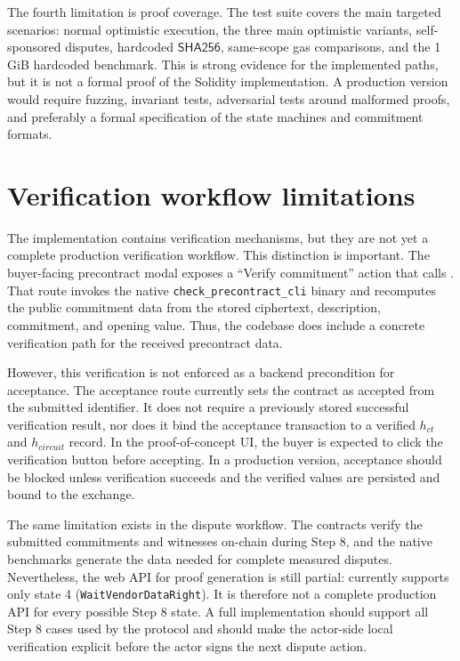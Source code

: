 The fourth limitation is proof coverage. The test suite covers the main targeted scenarios:
normal optimistic execution, the three main optimistic variants, self-sponsored disputes,
hardcoded \(\mathsf{SHA256}\), same-scope gas comparisons, and the 1 GiB hardcoded
benchmark. This is strong evidence for the implemented paths, but it is not a formal proof
of the Solidity implementation. A production version would require fuzzing, invariant
tests, adversarial tests around malformed proofs, and preferably a formal specification of
the state machines and commitment formats.

\section{Verification workflow limitations}

The implementation contains verification mechanisms, but they are not yet a complete
production verification workflow. This distinction is important. The buyer-facing
precontract modal exposes a ``Verify commitment'' action that calls
. That route invokes the native
\texttt{check\_precontract\_cli} binary and recomputes the public commitment data from the
stored ciphertext, description, commitment, and opening value. Thus, the codebase does
include a concrete verification path for the received precontract data.

However, this verification is not enforced as a backend precondition for acceptance. The
acceptance route  currently sets the contract as accepted
from the submitted identifier. It does not require a previously stored successful
verification result, nor does it bind the acceptance transaction to a verified
\(h_{\mathit{ct}}\) and \(h_{\mathit{circuit}}\) record. In the proof-of-concept UI, the
buyer is expected to click the verification button before accepting. In a production
version, acceptance should be blocked unless verification succeeds and the verified values
are persisted and bound to the exchange.

The same limitation exists in the dispute workflow. The contracts verify the submitted
commitments and witnesses on-chain during Step 8, and the native benchmarks generate the
data needed for complete measured disputes. Nevertheless, the web API for proof generation
is still partial:  currently supports only state 4
(\texttt{WaitVendorDataRight}). It is therefore not a complete production API for every
possible Step 8 state. A full implementation should support all Step 8 cases used by the
protocol and should make the actor-side local verification explicit before the actor signs
the next dispute action.

